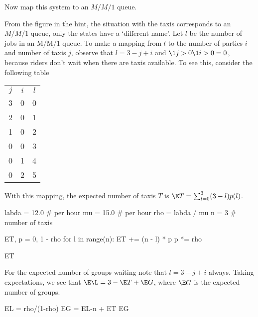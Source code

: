 \begin{exercise}[Hall 5.22]
\begin{hint}
\begin{center}
 \end{center}
Now map this system to an $M/M/1$ queue.
\end{hint}
\begin{solution}
  From the figure in the hint, the situation with the taxis corresponds to an $M/M/1$ queue, only the states have a `different name'.
  Let $l$ be the number of jobs in an M/M/1 queue.
  To make a mapping from $l$ to the number of parties $i$ and number of taxis $j$, observe that $l = 3 - j +i$ and $\1{j>0}\1{i>0} = 0$, because riders don't wait when there are taxis available. To see this,  consider the following table
\begin{center}
\begin{tabular}{ccc}
$j$ & $i$ & $l$\\
3& 0 & 0\\
2 & 0& 1\\
1 & 0& 2\\
0& 0& 3\\
0& 1& 4\\
0& 2& 5\\
\end{tabular}
\end{center}

With this mapping, the expected number of taxis $T$ is $\E T =  \sum_{l=0}^3 (3-l)p(l)$.
\begin{pyconsole}
labda = 12.0  # per hour
mu = 15.0  # per hour
rho = labda / mu
n = 3  # number of taxis

ET, p = 0, 1 - rho
for l in range(n):
    ET += (n - l) * p
    p *= rho

ET
\end{pyconsole}
For the expected number of groups waiting note that $l=3-j+i$ always.
Taking expectations, we see that $\E \L = 3 - \E T + \E G$, where $\E G$ is the expected number of groups.
\begin{pyconsole}
EL = rho/(1-rho)
EG = EL-n + ET
EG
\end{pyconsole}


\end{solution}
\end{exercise}
